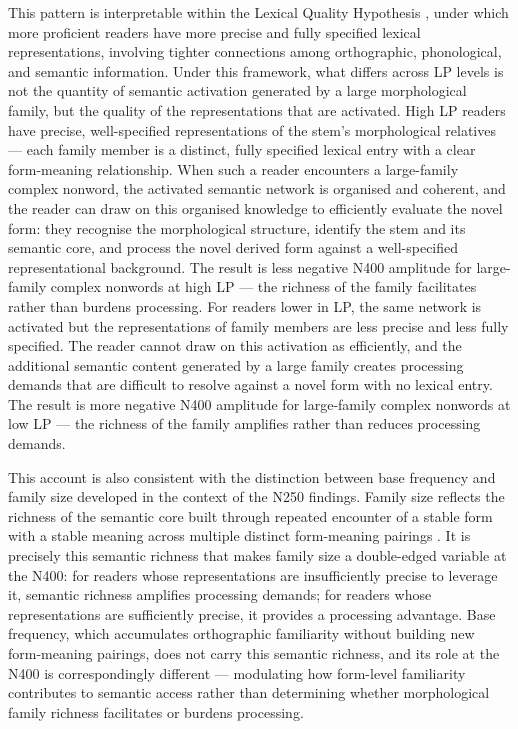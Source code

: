 \documentclass[utf8]{FrontiersinHarvard} %
\begin{document}
	This pattern is interpretable within the Lexical Quality Hypothesis \citep{perfettiReadingAbilityLexical2007}, under which more proficient readers have more precise and fully specified lexical representations, involving tighter connections among orthographic, phonological, and semantic information. Under this framework, what differs across LP levels is not the quantity of semantic activation generated by a large morphological family, but the quality of the representations that are activated. High LP readers have precise, well-specified representations of the stem's morphological relatives --- each family member is a distinct, fully specified lexical entry with a clear form-meaning relationship. When such a reader encounters a large-family complex nonword, the activated semantic network is organised and coherent, and the reader can draw on this organised knowledge to efficiently evaluate the novel form: they recognise the morphological structure, identify the stem and its semantic core, and process the novel derived form against a well-specified representational background. The result is less negative N400 amplitude for large-family complex nonwords at high LP --- the richness of the family facilitates rather than burdens processing. For readers lower in LP, the same network is activated but the representations of family members are less precise and less fully specified. The reader cannot draw on this activation as efficiently, and the additional semantic content generated by a large family creates processing demands that are difficult to resolve against a novel form with no lexical entry. The result is more negative N400 amplitude for large-family complex nonwords at low LP --- the richness of the family amplifies rather than reduces processing demands.
	
	This account is also consistent with the distinction between base frequency and family size developed in the context of the N250 findings. Family size reflects the richness of the semantic core built through repeated encounter of a stable form with a stable meaning across multiple distinct form-meaning pairings \citep{bolgerContextVariationDefinitions2008, liLearningNovelComplex2026}. It is precisely this semantic richness that makes family size a double-edged variable at the N400: for readers whose representations are insufficiently precise to leverage it, semantic richness amplifies processing demands; for readers whose representations are sufficiently precise, it provides a processing advantage. Base frequency, which accumulates orthographic familiarity without building new form-meaning pairings, does not carry this semantic richness, and its role at the N400 is correspondingly different --- modulating how form-level familiarity contributes to semantic access rather than determining whether morphological family richness facilitates or burdens processing.
	
\end{document}
